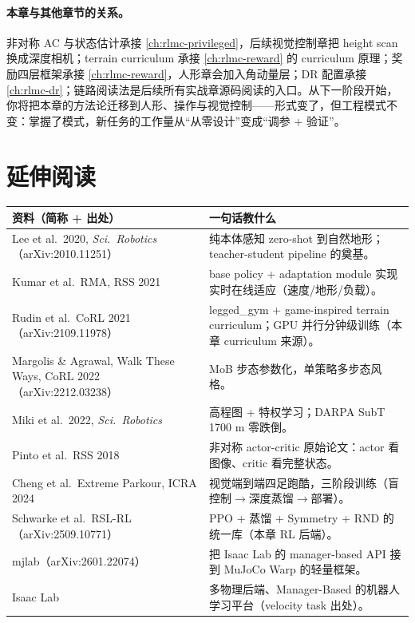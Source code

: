 \paragraph{本章与其他章节的关系。}非对称 AC 与状态估计承接 \cref{ch:rlmc-privileged}，后续视觉控制章把 height scan 换成深度相机；terrain curriculum 承接 \cref{ch:rlmc-reward} 的 curriculum 原理；奖励四层框架承接 \cref{ch:rlmc-reward}，人形章会加入角动量层；DR 配置承接 \cref{ch:rlmc-dr}；链路阅读法是后续所有实战章源码阅读的入口。从下一阶段开始，你将把本章的方法论迁移到人形、操作与视觉控制——形式变了，但工程模式不变：掌握了模式，新任务的工作量从“从零设计”变成“调参 + 验证”。

\section{延伸阅读}
\label{sec:rlmc-ql-further}

\begin{center}
\small
\begin{tabular}{@{}p{6.4cm}p{7.2cm}@{}}
\toprule
资料（简称 + 出处） & 一句话教什么 \\
\midrule
Lee et al.\ 2020, \textit{Sci.\ Robotics}（arXiv:2010.11251）\,\cite{lee2020quadruped} & 纯本体感知 zero-shot 到自然地形；teacher-student pipeline 的奠基。 \\
Kumar et al.\ RMA, RSS 2021\,\cite{kumar2021rma} & base policy + adaptation module 实现实时在线适应（速度/地形/负载）。 \\
Rudin et al.\ CoRL 2021（arXiv:2109.11978）\,\cite{rudin2021minutes} & legged\_gym + game-inspired terrain curriculum；GPU 并行分钟级训练（本章 curriculum 来源）。 \\
Margolis \& Agrawal, Walk These Ways, CoRL 2022（arXiv:2212.03238）\,\cite{margolis2022walk} & MoB 步态参数化，单策略多步态风格。 \\
Miki et al.\ 2022, \textit{Sci.\ Robotics}\,\cite{miki2022perceptive} & 高程图 + 特权学习；DARPA SubT 1700 m 零跌倒。 \\
Pinto et al.\ RSS 2018\,\cite{pinto2018asymmetric} & 非对称 actor-critic 原始论文：actor 看图像、critic 看完整状态。 \\
Cheng et al.\ Extreme Parkour, ICRA 2024\,\cite{cheng2024parkour} & 视觉端到端四足跑酷，三阶段训练（盲控制$\to$深度蒸馏$\to$部署）。 \\
Schwarke et al.\ RSL-RL（arXiv:2509.10771）\,\cite{schwarke2025rslrl} & PPO + 蒸馏 + Symmetry + RND 的统一库（本章 RL 后端）。 \\
mjlab（arXiv:2601.22074）\,\cite{mjlab2026} & 把 Isaac Lab 的 manager-based API 接到 MuJoCo Warp 的轻量框架。 \\
Isaac Lab\,\cite{mittal2025isaaclab} & 多物理后端、Manager-Based 的机器人学习平台（velocity task 出处）。 \\
\bottomrule
\end{tabular}
\end{center}

